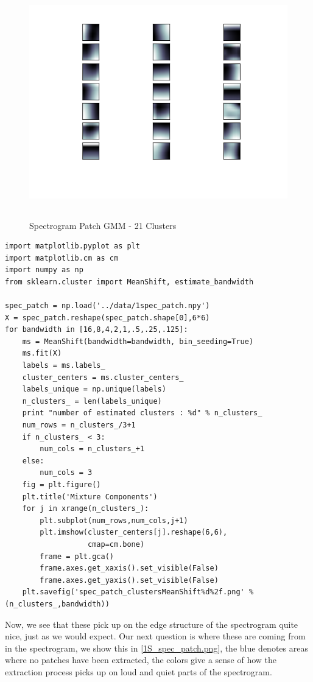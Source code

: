 \documentclass[11pt]{article}
\begin{document}
\begin{figure}[htb]
\centering
\includegraphics[height=10cm]{./spec_patch_clustersGMM21.png}
\caption{\label{fig:spec_patch_clustersGMM21}Spectrogram Patch GMM - 21 Clusters}
\end{figure}




\begin{verbatim}
import matplotlib.pyplot as plt
import matplotlib.cm as cm
import numpy as np
from sklearn.cluster import MeanShift, estimate_bandwidth

spec_patch = np.load('../data/1spec_patch.npy')
X = spec_patch.reshape(spec_patch.shape[0],6*6)
for bandwidth in [16,8,4,2,1,.5,.25,.125]:
    ms = MeanShift(bandwidth=bandwidth, bin_seeding=True)
    ms.fit(X)
    labels = ms.labels_
    cluster_centers = ms.cluster_centers_
    labels_unique = np.unique(labels)
    n_clusters_ = len(labels_unique)
    print "number of estimated clusters : %d" % n_clusters_
    num_rows = n_clusters_/3+1
    if n_clusters_ < 3:
        num_cols = n_clusters_+1
    else:
        num_cols = 3
    fig = plt.figure()
    plt.title('Mixture Components')
    for j in xrange(n_clusters_):
        plt.subplot(num_rows,num_cols,j+1)
        plt.imshow(cluster_centers[j].reshape(6,6),
                   cmap=cm.bone)
        frame = plt.gca()
        frame.axes.get_xaxis().set_visible(False)
        frame.axes.get_yaxis().set_visible(False)
    plt.savefig('spec_patch_clustersMeanShift%d%2f.png' % (n_clusters_,bandwidth))
\end{verbatim}


Now, we see that these pick up on the edge structure of the
spectrogram quite nice, just as we would expect.  Our next question is
where these are coming from in the spectrogram, we show this in
\ref{1S_spec_patch.png}, the blue denotes areas where no patches have
been extracted, the colors give a sense of how the extraction process
picks up on loud and quiet parts of the spectrogram.
\end{document}
